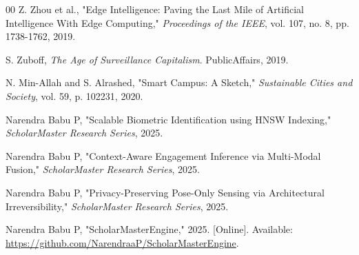 \documentclass[conference]{IEEEtran}
\begin{document}
\begin{thebibliography}{00}
 Z. Zhou et al., "Edge Intelligence: Paving the Last Mile of Artificial Intelligence With Edge Computing," \textit{Proceedings of the IEEE}, vol. 107, no. 8, pp. 1738-1762, 2019.

 S. Zuboff, \textit{The Age of Surveillance Capitalism}. PublicAffairs, 2019.


 N. Min-Allah and S. Alrashed, "Smart Campus: A Sketch," \textit{Sustainable Cities and Society}, vol. 59, p. 102231, 2020.


 Narendra Babu P, "Scalable Biometric Identification using HNSW Indexing," \textit{ScholarMaster Research Series}, 2025.

 Narendra Babu P, "Context-Aware Engagement Inference via Multi-Modal Fusion," \textit{ScholarMaster Research Series}, 2025.

 Narendra Babu P, "Privacy-Preserving Pose-Only Sensing via Architectural Irreversibility," \textit{ScholarMaster Research Series}, 2025.


 Narendra Babu P, "ScholarMasterEngine," 2025. [Online]. Available: \url{https://github.com/NarendraaP/ScholarMasterEngine}.

\end{thebibliography}
\end{document}
